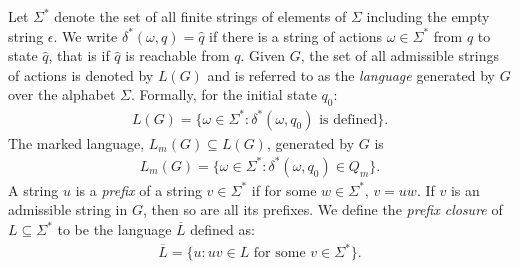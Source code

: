 \documentclass[letterpaper, 10 pt, conference]{ieeeconf}
\begin{document}
Let $\Sigma^*$ denote the set of all finite strings of elements of $\Sigma$ including the empty string $\epsilon$. We write $\delta^*(\omega, q) = \widehat{q}$ if there is a string of actions $\omega \in \Sigma^*$ from $q$ to state $\widehat{q}$, that is if $\widehat{q}$ is reachable from $q$. Given $G$, the set of all admissible strings of actions is denoted by $L(G)$ and is referred to as the \textit{language} generated by $G$ over the alphabet $\Sigma$. Formally, for the initial state $q_0$:
\begin{align}\label{xx}
    L(G) = \{\omega \in \Sigma^*: \delta^*(\omega, q_0) \text{ is defined} \}.
\end{align}
The marked language, $L_m(G) \subseteq L(G)$, generated by $G$ is 
\begin{align}
    L_m(G) = \{\omega \in \Sigma^*: \delta^*(\omega, q_0) \in Q_m \}. \nonumber
\end{align}
A string $u$ is a {\it prefix} of a string $v \in \Sigma^*$ if for some $w \in \Sigma^*$, $v = uw$. If $v$ is an admissible string in $G$, then so are all its prefixes. We define the {\it prefix closure} of $L \subseteq \Sigma^*$ to be the language $\overline{L}$ defined as:
\begin{align}
    \overline{L} = \{ u: uv \in L \text{ for some } v \in \Sigma^* \}. \nonumber
\end{align}

\end{document}
